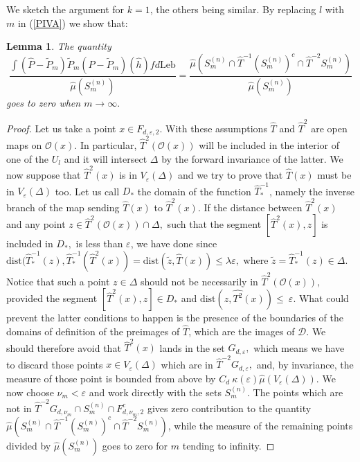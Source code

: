 \documentclass[12pt,reqno,a4paper]{amsart}
\newtheorem{lemma}[thm]{Lemma}
\let\tilde\widetilde
\def\Le{\text{Leb}}
\def\P{\hat{P}}
\begin{document}
We sketch the argument for $k=1$, the others being similar. By replacing $l$ with $m$ in (\ref{PIVA}) we show that:
\begin{lemma}
The quantity
\begin{equation}\label{FFF}
 \frac{\int (\P-\tilde{P}_m)\tilde{P}_m(\P-\tilde{P}_m)(\hat{h})fd\Le}{{\hat{\mu}(S_m^{(n)})}}=\frac{\hat{\mu}(S^{(n)}_m\cap\hat{T}^{-1}(S^{(n)}_m)^c
 \cap \hat{T}^{-2}S^{(n)}_m)}{\hat{\mu}(S_m^{(n)})}
\end{equation}
goes to zero when $m\rightarrow \infty.$
\end{lemma}
\begin{proof}
 Let us  take a point $x\in F_{d, \varepsilon, 2}$. With these assumptions $\hat{T}$ and $\hat{T}^2$
are open maps on $\mathcal{O}(x)$. In particular, $\hat{T}^2(\mathcal{O}(x))$
will be included in the interior of one of the $U_l$ and
 it will intersect $\Delta$ by the forward invariance of the latter. We now suppose that $\hat{T}^2(x)$ is in $V_{\varepsilon}(\Delta)$ and we try to prove that $\hat{T}(x)$ must be in $V_{\varepsilon}(\Delta)$ too. Let us call $D_*$ the domain of the function  $\hat{T}^{-1}_*$, namely the inverse branch of the map sending $\hat{T}(x)$ to  $\hat{T}^2(x). $ If the distance between $\hat{T}^2(x)$ and any point $z\in \hat{T}^2(\mathcal{O}(x))\cap \Delta,$  such that the segment $[ \hat{T}^2(x), z]$ is included in $D_*,$ is less than $\varepsilon$, we have done since $\text{dist}(\hat{T}^{-1}_*(z),
 \hat{T}^{-1}_*(\hat{T}^2(x))=\text{dist}(\tilde{z},\hat{T}(x))\le \lambda \varepsilon,$  where $\tilde{z}=\hat{T}^{-1}_*(z)\in \Delta.$ Notice that such a point $z\in \Delta$ should not be necessarily in $\hat{T}^2(\mathcal{O}(x)),$ provided the segment $[ \hat{T}^2(x), z]\in D_*$ and $\text{dist}(z,\hat{T^2}(x))\le \ \varepsilon.$ What could prevent the latter conditions to happen is the presence of the boundaries of the domains of definition of the preimages of $\hat{T}$, which are the images of $\mathcal{D}.$
We should therefore avoid that $\hat{T}^2(x)$ lands in the set $G_{d, \varepsilon},$  which means we have to discard those points  $x\in V_{\varepsilon}(\Delta)$ which are in  $\hat{T}^{-2}G_{d, \varepsilon},$ and, by invariance, the measure of those point is bounded from above by $C_d \ \kappa(\varepsilon) \hat{\mu}(V_{\varepsilon}(\Delta)).$ We now choose $\nu_m<\varepsilon$ and work directly with the sets $S_m^{(n)}.$ The points which are not in $\hat{T}^{-2}G_{d, \nu_m }\cap S_m^{(n)}\cap F_{d, \nu_m, 2}^c $ gives zero contribution  to the quantity $\hat{\mu}(S^{(n)}_m\cap\hat{T}^{-1}(S^{(n)}_m)^c
 \cap \hat{T}^{-2}S^{(n)}_m)$, while the measure of the remaining points divided by $\hat{\mu}(S_m^{(n)})$ goes to zero for $m$ tending to infinity.










 \end{proof}
\end{document}
